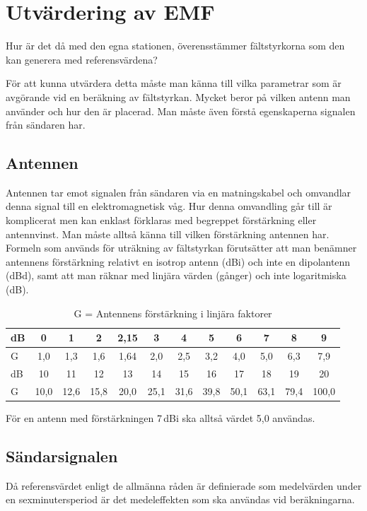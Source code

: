 \section{Utvärdering av EMF}

Hur är det då med den egna stationen, överensstämmer fältstyrkorna som den kan
generera med referensvärdena?

För att kunna utvärdera detta måste man känna till vilka parametrar som är
avgörande vid en beräkning av fältstyrkan.
Mycket beror på vilken antenn man använder och hur den är placerad.
Man måste även förstå egenskaperna signalen från sändaren har.

\subsection{Antennen}
Antennen tar emot signalen från sändaren via en matningskabel och omvandlar
denna signal till en elektromagnetisk våg.
Hur denna omvandling går till är komplicerat men kan enklast förklaras med
begreppet förstärkning eller antennvinst.
Man måste alltså känna till vilken förstärkning antennen har.
Formeln som används för uträkning av fältstyrkan förutsätter att man benämner
antennens förstärkning relativt en isotrop antenn (dBi) och inte en dipolantenn
(dBd), samt att man räknar med linjära värden (gånger) och inte logaritmiska
(dB).

\begin{table}[ht]
  \begin{center}
    \begin{tabular}{|l|ccccccccccc|}
    \hline
    dB     &  0  &  1  &  2 & 2,15 &  3  &  4  &  5  &  6  &  7  &  8  &  9  \\ \hline
    G & 1,0 & 1,3 & 1,6 & 1,64 & 2,0 & 2,5 & 3,2 & 4,0 & 5,0 & 6,3 & 7,9 \\ \hline\hline
    dB     &  10  &  11  &  12  &  13  &  14  &  15  &  16  &  17  &  18  &  19  &  20 \\ \hline
    G & 10,0 & 12,6 & 15,8 & 20,0 & 25,1 & 31,6 & 39,8 & 50,1 & 63,1 & 79,4 & 100,0 \\ \hline
    \end{tabular}
    \caption{G = Antennens förstärkning i linjära faktorer}
    \label{tab:forst}
  \end{center}
\end{table}

För en antenn med förstärkningen 7\,dBi ska alltså värdet 5,0 användas.

\subsection{Sändarsignalen}
Då referensvärdet enligt de allmänna råden är definierade som medelvärden under
en sexminutersperiod är det medeleffekten som ska användas vid beräkningarna.

